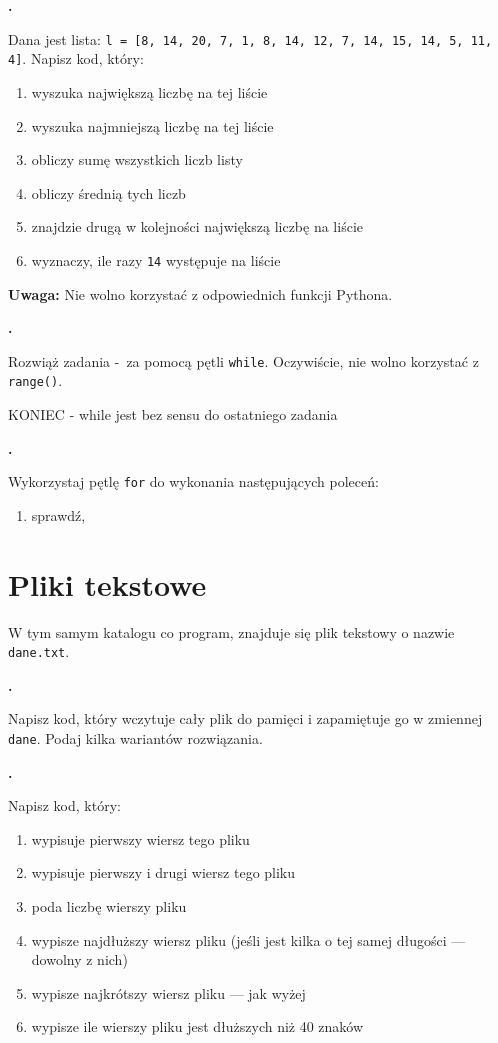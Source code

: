 \documentclass[a4paper]{article}
\begin{document}
\textbf{.}\addtocounter{zadanie}{1} Dana jest lista: \texttt{l = [8, 14, 20, 7, 1, 8, 14, 12, 7, 14, 15, 14, 5, 11, 4]}. Napisz kod, który:
\begin{enumerate}[label=\arabic*.]
    \item wyszuka największą liczbę na tej liście
    \item wyszuka najmniejszą liczbę na tej liście
    \item obliczy sumę wszystkich liczb listy
    \item obliczy średnią tych liczb
    \item znajdzie drugą w kolejności największą liczbę na liście
    \item wyznaczy, ile razy \texttt{14} występuje na liście
\end{enumerate}
\textbf{Uwaga:} Nie wolno korzystać z odpowiednich funkcji Pythona.

\textbf{.}\addtocounter{zadanie}{1} Rozwiąż zadania \thewhileloop-\thewhileloopx\ za pomocą pętli \texttt{while}. Oczywiście, nie wolno korzystać z \verb|range()|.

KONIEC - while jest bez sensu do ostatniego zadania

\textbf{.}\addtocounter{zadanie}{1} Wykorzystaj  pętlę \verb|for| do wykonania następujących poleceń:
\begin{enumerate}[label=\arabic*.]
    \item sprawdź,
\end{enumerate}

\section{Pliki tekstowe}
W tym samym katalogu co program, znajduje się plik tekstowy o nazwie \texttt{dane.txt}.

\textbf{.}\addtocounter{zadanie}{1} Napisz kod, który wczytuje cały plik do pamięci i zapamiętuje go w zmiennej \texttt{dane}. Podaj kilka wariantów rozwiązania.

\textbf{.}\addtocounter{zadanie}{1} Napisz kod, który:
\begin{enumerate}[label=\arabic*.]
    \item wypisuje pierwszy wiersz tego pliku
    \item wypisuje pierwszy i drugi wiersz tego pliku
    \item poda liczbę wierszy pliku
    \item wypisze najdłuższy wiersz pliku (jeśli jest kilka o tej samej długości --- dowolny z nich)
    \item wypisze najkrótszy wiersz pliku --- jak wyżej
    \item wypisze ile wierszy pliku jest dłuższych niż 40 znaków
\end{enumerate}
\end{document}
